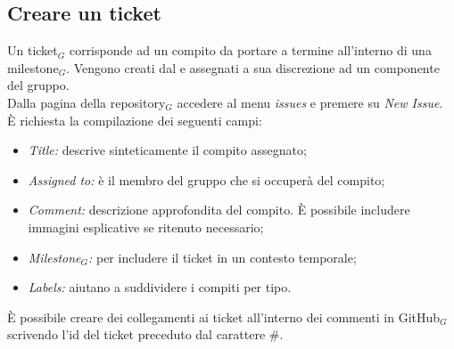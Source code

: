 \subsection{Creare un ticket}
Un ticket$_{G}$ corrisponde ad un compito da portare a termine all'interno di una milestone$_{G}$. Vengono creati dal \ruoloResponsabile{} e assegnati a sua discrezione ad un componente del gruppo. \\
Dalla pagina della repository$_{G}$ accedere al menu \textit{issues} e premere su \textit{New Issue}.\\
È richiesta la compilazione dei seguenti campi:
\begin{itemize}
    \item \textit{Title:} descrive sinteticamente il compito assegnato;
    \item \textit{Assigned to:} è il membro del gruppo che si occuperà del compito;
    \item \textit{Comment:} descrizione approfondita del compito. È possibile includere immagini esplicative se ritenuto necessario;
    \item \textit{Milestone$_{G}$:} per includere il ticket in un contesto temporale;
    \item \textit{Labels:} aiutano a suddividere i compiti per tipo.
\end{itemize}
È possibile creare dei collegamenti ai ticket all'interno dei commenti in GitHub$_{G}$ scrivendo l'id del ticket preceduto dal carattere \#.


